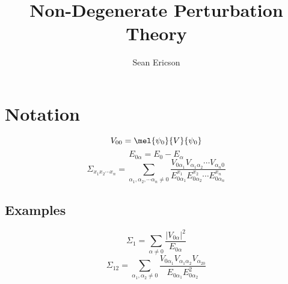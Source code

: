 \documentclass[12pt]{article}
\newcommand{\magsq}[1]{\big|#1\big|^2}
\begin{document}
	
\title{Non-Degenerate Perturbation Theory}
\author{Sean Ericson}
\maketitle

\section*{Notation}
\[ V_{00} = \mel{\psi_0}{V}{\psi_0} \]
\[ E_{0\alpha} = E_0 - E_\alpha \]
\[ \Sigma_{x_1x_2\cdots x_n} = \sum_{\alpha_1,\alpha_2,\cdots \alpha_n\neq 0} \frac{V_{0\alpha_1}V_{\alpha_1\alpha_2}\cdots V_{\alpha_n0}}{E_{0\alpha_1}^{x_1}E_{0\alpha_2}^{x_2}\cdots E_{0\alpha_n}^{x_n}} \]
\subsection*{Examples}
\[ \Sigma_1 = \sum_{\alpha\neq 0}\frac{\magsq{V_{0\alpha}}}{E_{0\alpha}} \]
\[ \Sigma_{12} = \sum_{\alpha_1,\alpha_2\neq 0}\frac{V_{0\alpha_1}V_{\alpha_1\alpha_2}V_{\alpha_20}}{E_{0\alpha_1}E_{0\alpha_2}^2} \]
\end{document}
